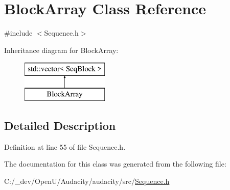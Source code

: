 \hypertarget{class_block_array}{}\section{Block\+Array Class Reference}
\label{class_block_array}


{\ttfamily \#include $<$Sequence.\+h$>$}

Inheritance diagram for Block\+Array\+:\begin{figure}[H]
\begin{center}
\leavevmode
\includegraphics[height=2.000000cm]{class_block_array}
\end{center}
\end{figure}


\subsection{Detailed Description}


Definition at line 55 of file Sequence.\+h.



The documentation for this class was generated from the following file\+:\begin{DoxyCompactItemize}
\item 
C\+:/\+\_\+dev/\+Open\+U/\+Audacity/audacity/src/\hyperlink{_sequence_8h}{Sequence.\+h}\end{DoxyCompactItemize}
